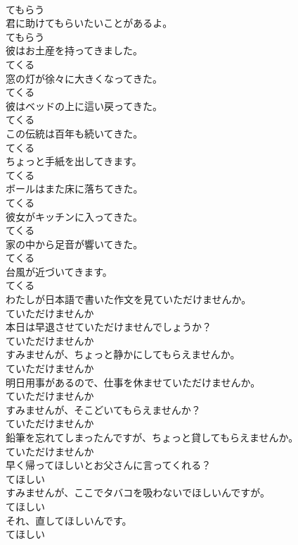 \documentclass[8pt]{extreport}
\begin{document}
\begin{CJK}{UTF8}{min}
\\	てもらう
\\	君に助けてもらいたいことがあるよ。	
\\	てもらう
\\	彼はお土産を持ってきました。	
\\	てくる
\\	窓の灯が徐々に大きくなってきた。	
\\	てくる
\\	彼はベッドの上に這い戻ってきた。	
\\	てくる
\\	この伝統は百年も続いてきた。	
\\	てくる
\\	ちょっと手紙を出してきます。	
\\	てくる
\\	ボールはまた床に落ちてきた。	
\\	てくる
\\	彼女がキッチンに入ってきた。	
\\	てくる
\\	家の中から足音が響いてきた。	
\\	てくる
\\	台風が近づいてきます。	
\\	てくる
\\	わたしが日本語で書いた作文を見ていただけませんか。	
\\	ていただけませんか
\\	本日は早退させていただけませんでしょうか？	
\\	ていただけませんか
\\	すみませんが、ちょっと静かにしてもらえませんか。	
\\	ていただけませんか
\\	明日用事があるので、仕事を休ませていただけませんか。	
\\	ていただけませんか
\\	すみませんが、そこどいてもらえませんか？	
\\	ていただけませんか
\\	鉛筆を忘れてしまったんですが、ちょっと貸してもらえませんか。	
\\	ていただけませんか
\\	早く帰ってほしいとお父さんに言ってくれる？	
\\	てほしい
\\	すみませんが、ここでタバコを吸わないでほしいんですが。	
\\	てほしい
\\	それ、直してほしいんです。	
\\	てほしい

\end{CJK}
\end{document}
